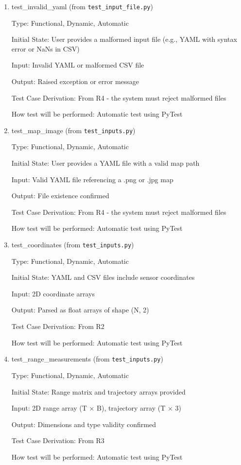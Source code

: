 \documentclass[12pt, titlepage]{article}
\begin{document}
\begin{enumerate}

\item{test\_invalid\_yaml (from \texttt{test\_input\_file.py})\\}

Type: Functional, Dynamic, Automatic
					
Initial State: User provides a malformed input file (e.g., YAML with syntax error or NaNs in CSV)
					
Input: Invalid YAML or malformed CSV file
					
Output: Raised exception or error message

Test Case Derivation: From R4 - the system must reject malformed files

How test will be performed: Automatic test using PyTest
					
\item{test\_map\_image (from \texttt{test\_inputs.py})\\}

Type: Functional, Dynamic, Automatic
					
Initial State: User provides a YAML file with a valid map path
					
Input: Valid YAML file referencing a .png or .jpg map
					
Output: File existence confirmed

Test Case Derivation: From R4 - the system must reject malformed files

How test will be performed: Automatic test using PyTest

\item{test\_coordinates (from \texttt{test\_inputs.py})\\}

Type: Functional, Dynamic, Automatic
					
Initial State: YAML and CSV files include sensor coordinates
					
Input: 2D coordinate arrays
					
Output: Parsed as float arrays of shape (N, 2)

Test Case Derivation: From R2

How test will be performed: Automatic test using PyTest

\item{test\_range\_measurements (from \texttt{test\_inputs.py})\\}

Type: Functional, Dynamic, Automatic
					
Initial State: Range matrix and trajectory arrays provided
					
Input: 2D range array (T × B), trajectory array (T × 3)
					
Output: Dimensions and type validity confirmed

Test Case Derivation: From R3

How test will be performed: Automatic test using PyTest
    
\end{enumerate}
\end{document}
